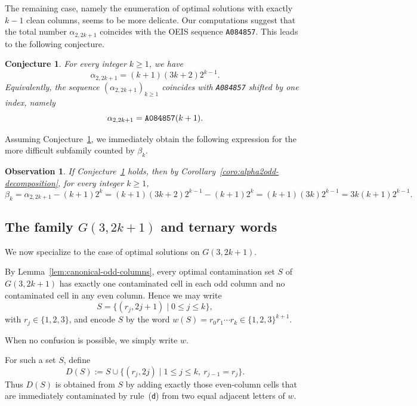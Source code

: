 \documentclass[letterpaper,12pt]{article}
\newtheorem{conjecture}{Conjecture}
\newtheorem{observation}{Observation}
\begin{document}
The remaining case, namely the enumeration of optimal solutions with exactly $k-1$ clean columns,
seems to be more delicate. Our computations suggest that the total number $\alpha_{2,2k+1}$
coincides with the OEIS sequence \textup{\texttt{A084857}}. This leads to the following conjecture.
\begin{conjecture}\label{conj:alpha2odd-total}
For every integer \(k \ge 1\), we have
\begin{equation}
    \alpha_{2,2k+1}=(k+1)(3k+2)2^{k-1}.
\end{equation}
Equivalently, the sequence \((\alpha_{2,2k+1})_{k\ge 1}\) coincides with \textup{\texttt{A084857}} shifted by one index, namely
\[
\alpha_{2,2k+1}=\textup{\texttt{A084857}}(k+1).
\]
\end{conjecture}
 

Assuming Conjecture~\ref{conj:alpha2odd-total}, we immediately obtain the following expression
for the more difficult subfamily counted by $\beta_k$.

\begin{observation} 
If Conjecture~\ref{conj:alpha2odd-total} holds, then by Corollary~\ref{coro:alpha2odd-decomposition}, for every integer $k\ge 1$,
\[
\beta_k=\alpha_{2,2k+1}-(k+1)2^k=(k+1)(3k+2)2^{k-1}-(k+1)2^k
      =(k+1)(3k)2^{k-1}
      =3k(k+1)2^{k-1}.
\]
 \end{observation}

 

 

\subsection{The family \texorpdfstring{$G(3,2k+1)$}{} and ternary words}

 
We now specialize to the case of optimal solutions on \(G(3,2k+1)\).

By Lemma~\ref{lem:canonical-odd-columns}, every optimal contamination set
\(S\) of \(G(3,2k+1)\) has exactly one contaminated cell in each odd column and
no contaminated cell in any even column. Hence we may write
\[
S=\{(r_j,2j+1)\mid 0\le j\le k\}, 
\]
 with $r_j\in\{1,2,3\}$, and encode \(S\) by the word $w(S)=r_0r_1\cdots r_k\in\{1,2,3\}^{k+1}$. 

When no confusion is possible, we simply write \(w\).

For such a set \(S\), define
\[
D(S):=S\cup \{(r_j,2j)\mid 1\le j\le k,\ r_{j-1}=r_j\}.
\]
Thus \(D(S)\) is obtained from \(S\) by adding exactly those even-column cells
that are immediately contaminated by rule~\textup{(\texttt{d})} from two equal adjacent
letters of \(w\).
\end{document}

